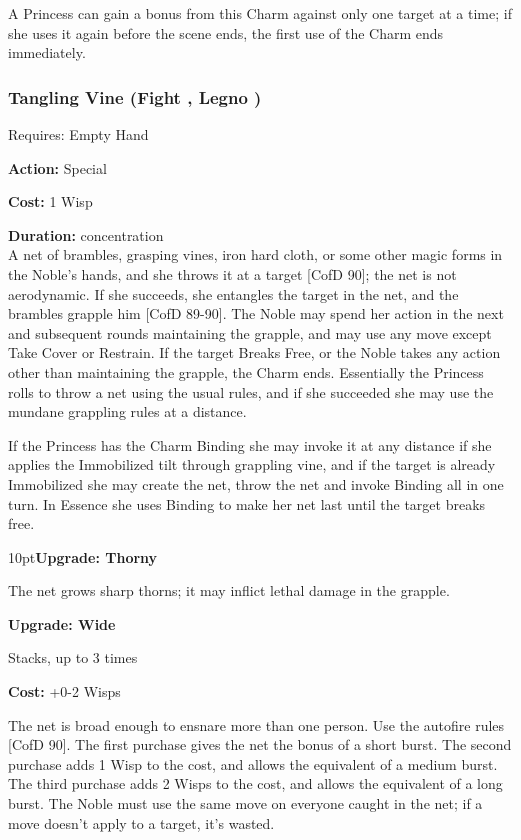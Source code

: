 A Princess can gain a bonus from this Charm against only one target at a time; if she uses it again before the scene ends, the first use of the Charm ends immediately.


\subsubsection*{Tangling Vine (Fight \textbullet\textbullet\textbullet, Legno \textbullet\textbullet)}

\noindent Requires: Empty Hand

\noindent \textbf{Action:} Special

\noindent \textbf{Cost:} 1 Wisp

\noindent \textbf{Duration:} concentration\\

\noindent A net of brambles, grasping vines, iron hard cloth, or some other magic forms in the Noble’s hands, and she throws it at a target [CofD 90]; the net is not aerodynamic. If she succeeds, she entangles the target in the net, and the brambles grapple him [CofD 89-90]. The
Noble may spend her action in the next and subsequent rounds maintaining the grapple, and may use any move except Take Cover or Restrain. If the target Breaks Free, or the Noble takes any action other than maintaining the grapple, the Charm ends. Essentially the Princess rolls to throw a net using the usual rules, and if she succeeded she may use the mundane grappling rules at a distance. 

If the Princess has the Charm Binding she may invoke it at any distance if she applies the Immobilized tilt through grappling vine, and if the target is already Immobilized she may create the net, throw the net and invoke Binding all in one turn. In Essence she uses Binding to make her net last until the target breaks free.

\begin{myindentpar}{10pt}\textbf{Upgrade: Thorny}

The net grows sharp thorns; it may inflict lethal damage in the grapple.

\textbf{Upgrade: Wide}

\noindent Stacks, up to 3 times

\noindent \textbf{Cost:} +0-2 Wisps

The net is broad enough to ensnare more than one person. Use the autofire rules [CofD 90]. The first purchase gives the net the bonus of a short burst. The second purchase adds 1 Wisp to the cost, and allows the equivalent of a medium burst. The third purchase adds 2 Wisps to the cost, and allows the equivalent of a long burst. The Noble must use the same move on everyone caught in the net; if a move doesn’t apply to a target, it’s wasted.\end{myindentpar}

